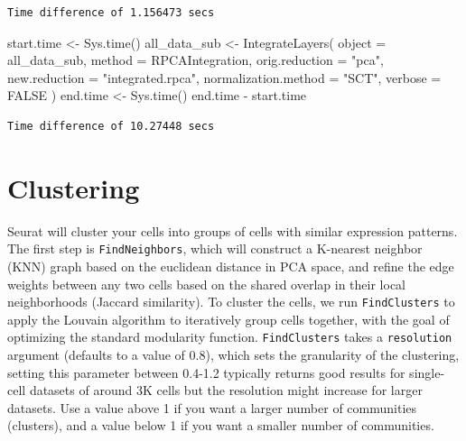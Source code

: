 \documentclass[
  letterpaper,
  DIV=11,
  numbers=noendperiod]{scrreprt}
\newenvironment{Shaded}{\begin{snugshade}}{\end{snugshade}}
\newcommand{\AttributeTok}[1]{\textcolor[rgb]{0.40,0.45,0.13}{#1}}
\newcommand{\ConstantTok}[1]{\textcolor[rgb]{0.56,0.35,0.01}{#1}}
\newcommand{\FunctionTok}[1]{\textcolor[rgb]{0.28,0.35,0.67}{#1}}
\newcommand{\NormalTok}[1]{\textcolor[rgb]{0.00,0.23,0.31}{#1}}
\newcommand{\OtherTok}[1]{\textcolor[rgb]{0.00,0.23,0.31}{#1}}
\newcommand{\SpecialCharTok}[1]{\textcolor[rgb]{0.37,0.37,0.37}{#1}}
\newcommand{\StringTok}[1]{\textcolor[rgb]{0.13,0.47,0.30}{#1}}
\begin{document}
\begin{verbatim}
Time difference of 1.156473 secs
\end{verbatim}

\begin{Shaded}
\begin{Highlighting}[]
\NormalTok{start.time }\OtherTok{\textless{}{-}} \FunctionTok{Sys.time}\NormalTok{()}
\NormalTok{all\_data\_sub }\OtherTok{\textless{}{-}} \FunctionTok{IntegrateLayers}\NormalTok{(}
  \AttributeTok{object =}\NormalTok{ all\_data\_sub, }\AttributeTok{method =}\NormalTok{ RPCAIntegration,}
  \AttributeTok{orig.reduction =} \StringTok{"pca"}\NormalTok{, }\AttributeTok{new.reduction =} \StringTok{"integrated.rpca"}\NormalTok{, }\AttributeTok{normalization.method =} \StringTok{"SCT"}\NormalTok{,}
  \AttributeTok{verbose =} \ConstantTok{FALSE}
\NormalTok{)}
\NormalTok{end.time }\OtherTok{\textless{}{-}} \FunctionTok{Sys.time}\NormalTok{()}
\NormalTok{end.time }\SpecialCharTok{{-}}\NormalTok{ start.time}
\end{Highlighting}
\end{Shaded}

\begin{verbatim}
Time difference of 10.27448 secs
\end{verbatim}

\section{Clustering}\label{clustering}

Seurat will cluster your cells into groups of cells with similar
expression patterns. The first step is \texttt{FindNeighbors}, which
will construct a K-nearest neighbor (KNN) graph based on the euclidean
distance in PCA space, and refine the edge weights between any two cells
based on the shared overlap in their local neighborhoods (Jaccard
similarity). To cluster the cells, we run \texttt{FindClusters} to apply
the Louvain algorithm to iteratively group cells together, with the goal
of optimizing the standard modularity function. \texttt{FindClusters}
takes a \texttt{resolution} argument (defaults to a value of 0.8), which
sets the granularity of the clustering, setting this parameter between
0.4-1.2 typically returns good results for single-cell datasets of
around 3K cells but the resolution might increase for larger datasets.
Use a value above 1 if you want a larger number of communities
(clusters), and a value below 1 if you want a smaller number of
communities.
\end{document}

